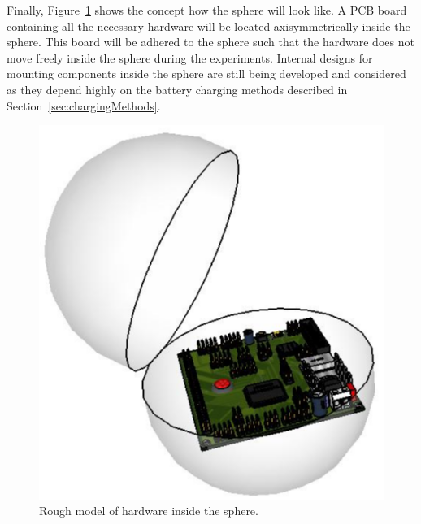 Finally, Figure~\ref{fig:sphere} shows the concept how the sphere will look like.  A PCB board containing all the necessary hardware will be located axisymmetrically inside the sphere.  This board will be adhered to the sphere such that the hardware does not move freely inside the sphere during the experiments.  Internal designs for mounting components inside the sphere are still being developed and considered as they depend highly on the battery charging methods described in Section~\ref{sec:chargingMethods}.

\begin{figure}[H]
	\centering
	\includegraphics[scale=0.6]{img/Sphere_001}
	\caption{Rough model of hardware inside the sphere. \label{fig:sphere}}
\end{figure}
